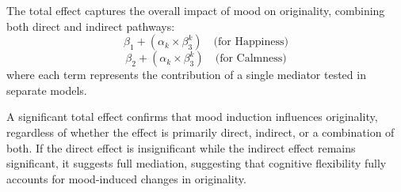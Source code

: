 \documentclass[../MA_Thesis.tex]{subfiles}
\begin{document}
The total effect captures the overall impact of mood on originality, combining both direct and indirect pathways:
\begin{equation*}
    \beta_1 + (\alpha_k \times \beta_3^k) \quad \text{(for Happiness)}
\end{equation*}
\begin{equation*}
    \beta_2 + (\alpha_k \times \beta_3^k) \quad \text{(for Calmness)}
\end{equation*}
where each term represents the contribution of a single mediator tested in separate models.

A significant total effect confirms that mood induction influences originality, regardless of whether the effect is primarily direct, indirect, or a combination of both. If the direct effect is insignificant while the indirect effect remains significant, it suggests full mediation, suggesting that cognitive flexibility fully accounts for mood-induced changes in originality.
\end{document}
